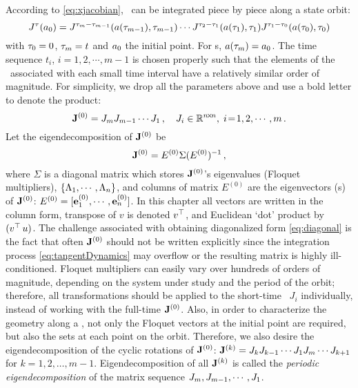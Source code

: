 According to
\eqref{eq:xjacobian}, \JacobianM\ can be integrated piece by
piece along a state orbit:
\[
  J^{\tau}(a_0) =
  J^{\tau_{m}-\tau_{m-1}}(a(\tau_{m-1}) ,\tau_{m-1})
  \cdots
  J^{\tau_{2}-\tau_{1}}(a(\tau_{1}) ,\tau_{1})
  J^{\tau_{1}-\tau_{0}}(a(\tau_{0}) ,\tau_{0})
\]
with $\tau_{0}=0$, $\tau_{m}=t$ and $a_0$ the initial point. For \po s,
$a(\tau_{m}) = a_0$.
The time sequence $t_i$, $i=1,2,\cdots, m-1$ is
chosen properly such that the elements of the
\JacobianM\ associated with each small time interval have a relatively
similar order of magnitude.
For simplicity, we drop all the parameters above and use a bold
letter to denote the product:
\begin{equation}
  \mathbf{J}^{(0)}=J_{m}J_{m-1}\cdots J_{1}\,,\quad
  J_{i}\in \mathbb{R}^{n\!\times\! n},\; i\!=\!1,2,\cdots,m
  \,.
  \label{eq:problem}
\end{equation}
Let the eigendecomposition of $\mathbf{J}^{(0)}$ be
\begin{equation}
  \label{eq:diagonal}
  \mathbf{J}^{(0)}=E^{(0)}\Sigma(E^{(0)})^{-1}
  \,,
\end{equation}
where $\Sigma$ is a diagonal matrix which stores $\mathbf{J}^{(0)}$'s
eigenvalues (Floquet multipliers),
$\{ \Lambda_{1}, \cdots, \Lambda_{n}\}$, and
columns of matrix $E^{(0)}$ are the eigenvectors (\Fv s)
of $\mathbf{J}^{(0)}$:
$E^{(0)}=[{\bf e}_{1}^{(0)}, \cdots, {\bf e}_{n}^{(0)}]$. In this chapter all
vectors are written in the column form, transpose of $v$ is denoted
${v}{}^\top$, and Euclidean `dot' product by $({v}{}^\top\,u)$. The
challenge associated with obtaining diagonalized form \eqref{eq:diagonal}
is the fact that often $\mathbf{J}^{(0)}$ should not be written
explicitly since the integration process \eqref{eq:tangentDynamics} may overflow
or the resulting matrix is highly ill-conditioned.
Floquet multipliers can easily vary over {hundreds of}
orders of magnitude,
depending on the system under study and the period of the orbit;
therefore, all transformations should be applied to the short-time
\JacobianMs\ $J_i$ individually, instead of working with the full-time
$\mathbf{J}^{(0)}$.
Also, in order to characterize
the geometry along a \po, not only the Floquet
vectors at the initial point are required, but also the
sets at each point on the orbit. Therefore, we also desire
the eigendecomposition of the cyclic rotations of $\mathbf{J}^{(0)}$:
$\mathbf{J}^{(k)}=J_{k}J_{k-1}\cdots J_{1}J_{m}\cdots
J_{k+1}$ for $k=1,2,\dots,m\!-\!1$. Eigendecomposition of all
$\mathbf{J}^{(k)}$ is called the \emph{periodic eigendecomposition} of the
matrix sequence $J_{m}, J_{m-1}, \cdots ,J_{1}$.

